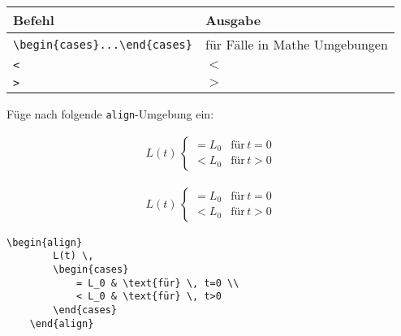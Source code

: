 \begin{frame}[fragile]
	\begin{center}
		\begin{tabular}{ll}
			\toprule
			Befehl									&	Ausgabe		\\ \midrule
			\lstinline|\begin{cases}...\end{cases}|	&	für Fälle in Mathe Umgebungen	\\
			\lstinline|<|							&	$<$		\\
			\lstinline|>|							&	$>$		\\
			\bottomrule
		\end{tabular}
	\end{center}
	\pause\btVFill
	\Aufgabee
	Füge nach  folgende \lstinline[basicstyle=\normalfont\normalsize]|align|-Umgebung ein:
	\begin{outputbox}
	    \begin{align}
	      L(t) \,
	      \begin{cases}
	        = L_0 & \text{für} \, t=0 \\
	        < L_0 & \text{für} \, t>0
	      \end{cases}
	    \end{align}
    \end{outputbox}
	\vspace{0.3cm}
\end{frame}
\begin{frame}[fragile]
	\Losung
	\begin{outputbox}
	    \begin{align}
			L(t) \,
			\begin{cases}
				= L_0 & \text{für} \, t=0 \\
				< L_0 & \text{für} \, t>0
			\end{cases}
	    \end{align}
	\end{outputbox}

	\Code
	\begin{lstlisting}[gobble=4]
	\begin{align}
		L(t) \,
		\begin{cases}
			= L_0 & \text{für} \, t=0 \\
			< L_0 & \text{für} \, t>0
		\end{cases}
	\end{align}
	\end{lstlisting}
\end{frame}
